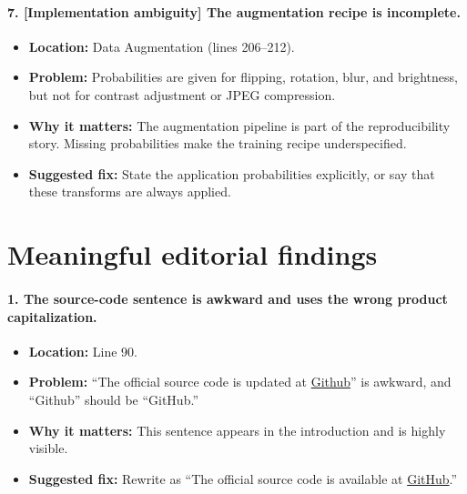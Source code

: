 \documentclass[11pt]{article}
\begin{document}
\paragraph{7. [Implementation ambiguity] The augmentation recipe is incomplete.}
\begin{itemize}
    \item \textbf{Location:} Data Augmentation (lines 206--212).
    \item \textbf{Problem:} Probabilities are given for flipping, rotation, blur, and brightness, but not for contrast adjustment or JPEG compression.
    \item \textbf{Why it matters:} The augmentation pipeline is part of the reproducibility story. Missing probabilities make the training recipe underspecified.
    \item \textbf{Suggested fix:} State the application probabilities explicitly, or say that these transforms are always applied.
\end{itemize}

\section*{Meaningful editorial findings}

\paragraph{1. The source-code sentence is awkward and uses the wrong product capitalization.}
\begin{itemize}
    \item \textbf{Location:} Line 90.
    \item \textbf{Problem:} ``The official source code is updated at \href{https://github.com/ducthinh4477/BiasLN}{Github}'' is awkward, and ``Github'' should be ``GitHub.''
    \item \textbf{Why it matters:} This sentence appears in the introduction and is highly visible.
    \item \textbf{Suggested fix:} Rewrite as ``The official source code is available at \href{https://github.com/ducthinh4477/BiasLN}{GitHub}.''
\end{itemize}
\end{document}
